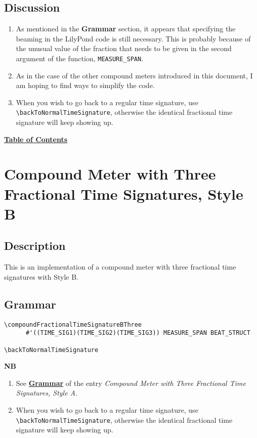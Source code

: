 \subsection{Discussion}
\label{sec:compoundfractionalmeter_discussion_two}
\begin{enumerate}
\item As mentioned in the \textbf{Grammar} section, it appears that specifying the beaming in the LilyPond code is still necessary. This is probably because of the unusual value of the fraction that needs to be given in the second argument of the function, \verb|MEASURE_SPAN|.
\item As in the case of the other compound meters introduced in this document, I am hoping to find ways to simplify the code. 
\item When you wish to go back to a regular time signature, use \verb|\backToNormalTimeSignature|, otherwise the identical fractional time signature will keep showing up.
\end{enumerate}



\hyperref[sec:toc]{\textbf{Table of Contents}}

\vfill \break






\section {Compound Meter with Three Fractional Time Signatures, Style B}

\hfill
{}
\hfill

\subsection{Description}
This is an implementation of a compound meter with three fractional time signatures with Style B.  

\subsection{Grammar}
\begin{verbatim}
\compoundFractionalTimeSignatureBThree 
      #'((TIME_SIG1)(TIME_SIG2)(TIME_SIG3)) MEASURE_SPAN BEAT_STRUCT

\backToNormalTimeSignature

\end{verbatim}
\textbf{NB}
\begin{enumerate}
\item See \hyperref[sec:compoundfractionalmeter_grammar]{\textbf{Grammar}} of the entry \textit{Compound Meter with Three Fractional Time Signatures, Style A.}
\item When you wish to go back to a regular time signature, use \verb|\backToNormalTimeSignature|, otherwise the identical fractional time signature will keep showing up.
\end{enumerate}

